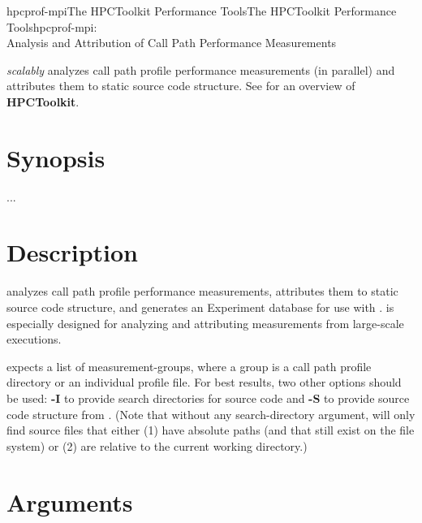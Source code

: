 \documentclass[english]{article}
\begin{document}
\begin{Name}{1}{hpcprof-mpi}{The HPCToolkit Performance Tools}{The HPCToolkit Performance Tools}{hpcprof-mpi:\\ Analysis and Attribution of Call Path Performance Measurements}

 \emph{scalably} analyzes call path profile performance measurements (in parallel) and attributes them to static source code structure.
See  for an overview of \textbf{HPCToolkit}.

\end{Name}

\section{Synopsis}

  ...

\section{Description}

 analyzes call path profile performance measurements, attributes them to static source code structure, and generates an Experiment database for use with .
 is especially designed for analyzing and attributing measurements from large-scale executions.

 expects a list of measurement-groups, where a group is a call path profile directory or an individual profile file.
For best results, two other options should be used: \textbf{-I} to provide search directories for source code and \textbf{-S} to provide source code structure from .
(Note that without any search-directory argument,  will only find source files that either (1) have absolute paths (and that still exist on the file system) or (2) are relative to the current working directory.)


\section{Arguments}
\end{document}
